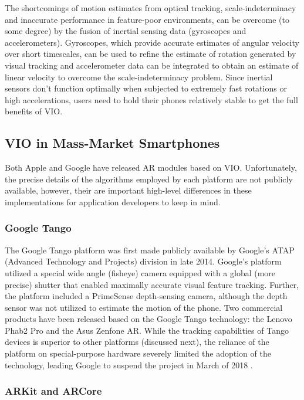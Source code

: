\documentclass[chi_draft]{sigchi}
\begin{document}
The shortcomings of motion estimates from optical tracking, scale-indeterminacy and inaccurate performance in feature-poor environments, can be overcome (to some degree) by the fusion of inertial sensing data (gyroscopes and accelerometers).  Gyroscopes, which provide accurate estimates of angular velocity over short timescales, can be used to refine the estimate of rotation generated by visual tracking and accelerometer data can be integrated to obtain an estimate of linear velocity to overcome the scale-indeterminacy problem.  Since inertial sensors don't function optimally when subjected to extremely fast rotations or high accelerations, users need to hold their phones relatively stable to get the full benefits of VIO.

\subsection{VIO in Mass-Market Smartphones}
Both Apple and Google have released AR modules based on VIO.  Unfortunately, the precise details of the algorithms employed by each platform are not publicly available, however, their are important high-level differences in these implementations for application developers to keep in mind.

\subsubsection{Google Tango}
The Google Tango platform was first made publicly available by Google's ATAP (Advanced Technology and Projects) division in late 2014.  Google's platform utilized a special wide angle (fisheye) camera equipped with a global (more precise) shutter that enabled maximally accurate visual feature tracking.  Further, the platform included a PrimeSense depth-sensing camera, although the depth sensor was not utilized to estimate the motion of the phone.  Two commercial products have been released based on the Google Tango technology: the Lenovo Phab2 Pro and the Asus Zenfone AR.  While the tracking capabilities of Tango devices is superior to other platforms (discussed next), the reliance of the platform on special-purpose hardware severely limited the adoption of the technology, leading Google to suspend the project in March of 2018 \cite{tangoretired}.


\subsubsection{ARKit and ARCore}
\end{document}

